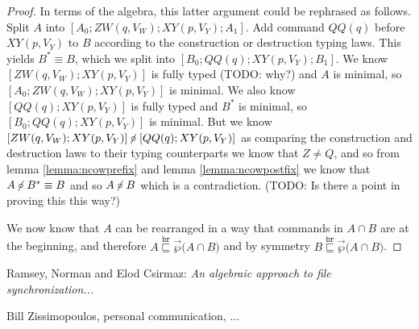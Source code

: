 \documentclass[12pt]{article}
\newcommand{\fscommand}[2]{{#1#2}}
\newcommand{\cxy}{\fscommand{X}{Y}}
\newcommand{\czw}{\fscommand{Z}{W}}
\newcommand{\cqq}{\fscommand{Q}{Q}}
\newcommand{\wrext}{\stackrel{\mathtt{br}}{\sqsubseteq}}
\newcommand{\ncoworks}{\centernot\circ}
\newcommand{\orderset}[1]{\vec{\wp}{#1}}
\theoremstyle{definition}
\begin{document}
\begin{proof}
In terms of the algebra, this latter argument could be rephrased as follows.
Split $A$ into $[A_0;\czw(q, V_W);\cxy(p, V_Y);A_1]$.
Add command $\cqq(q)$ before $\cxy(p, V_Y)$ to $B$ according to the construction or destruction typing laws.
This yields $B^*\equiv B$, which we split into $[B_0;\cqq(q);\cxy(p, V_Y);B_1]$.
We know $[\czw(q, V_W);\cxy(p, V_Y)]$ is fully typed (TODO: why?)
and $A$ is minimal, so $[A_0;\czw(q, V_W);\cxy(p, V_Y)]$ is minimal.
We also know $[\cqq(q);\cxy(p, V_Y)]$ is fully typed and $B^*$ is minimal, so $[B_0;\cqq(q);\cxy(p, V_Y)]$ is minimal.
But we know $[\czw(q, V_W);\cxy(p, V_Y)]\ncoworks [\cqq(q);\cxy(p, V_Y)]$
as comparing the construction and destruction laws to their typing counterparts we know that $Z\neq Q$,
and so from lemma \ref{lemma:ncowprefix} and lemma \ref{lemma:ncowpostfix}
we know that $A\ncoworks B^*\equiv B$ and so $A\ncoworks B$ which is a contradiction.
(TODO: Is there a point in proving this this way?)

\medskip

We now know that $A$ can be rearranged in a way that commands in $A\cap B$
are at the beginning, and therefore $A\wrext \orderset(A\cap B)$ and by symmetry $B\wrext \orderset(A\cap B)$.
\end{proof}


\begin{thebibliography}{99}

 Ramsey, Norman and Elod Csirmaz: {\it An algebraic approach to
file synchronization...}

 Bill Zissimopoulos, personal communication, ...

\end{thebibliography}
\end{document}
